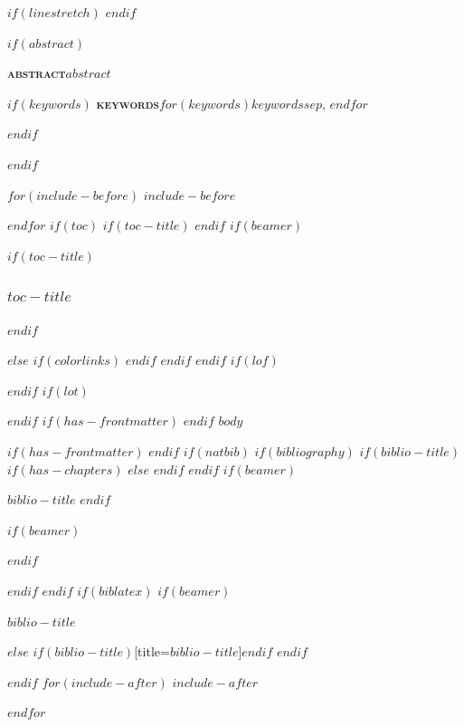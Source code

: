 \documentclass[
$if(fontsize)$
  $fontsize$,
$endif$
$if(papersize)$
  $papersize$paper,
$endif$
$if(beamer)$
  ignorenonframetext,
$if(handout)$
  handout,
$endif$
$if(aspectratio)$
  aspectratio=$aspectratio$,
$endif$
$endif$
$for(classoption)$
  $classoption$$sep$,
$endfor$
]{$documentclass$}
\newif\ifbibliography
\begin{document}
$if(linestretch)$
$endif$

$if(abstract)$
{\small
{\bfseries\scshape abstract}\hspace{1em}$abstract$\par
$if(keywords)$
{\bfseries\scshape keywords}\hspace{1em}$for(keywords)$$keywords$$sep$, $endfor$\par
$endif$
\vspace{1.8181\baselineskip} %
}$endif$

$for(include-before)$
$include-before$

$endfor$
$if(toc)$
$if(toc-title)$
\renewcommand*\contentsname{$toc-title$}
$endif$
$if(beamer)$
\begin{frame}[allowframebreaks]
$if(toc-title)$
  \frametitle{$toc-title$}
$endif$
  \tableofcontents[hideallsubsections]
\end{frame}
$else$
{
$if(colorlinks)$
\hypersetup{linkcolor=$if(toccolor)$$toccolor$$else$$endif$}
$endif$
\setcounter{tocdepth}{$toc-depth$}
\tableofcontents
}
$endif$
$endif$
$if(lof)$
\listoffigures
$endif$
$if(lot)$
\listoftables
$endif$
$if(has-frontmatter)$
\mainmatter
$endif$
$body$

$if(has-frontmatter)$
\backmatter
$endif$
$if(natbib)$
$if(bibliography)$
$if(biblio-title)$
$if(has-chapters)$
\renewcommand\bibname{$biblio-title$}
$else$
\renewcommand\refname{$biblio-title$}
$endif$
$endif$
$if(beamer)$
\begin{frame}[allowframebreaks]{$biblio-title$}
  \bibliographytrue
$endif$
  
$if(beamer)$
\end{frame}
$endif$

$endif$
$endif$
$if(biblatex)$
$if(beamer)$
\begin{frame}[allowframebreaks]{$biblio-title$}
  \bibliographytrue
  \printbibliography[heading=none]
\end{frame}
$else$
\printbibliography$if(biblio-title)$[title=$biblio-title$]$endif$
$endif$

$endif$
$for(include-after)$
$include-after$

$endfor$
\end{document}
